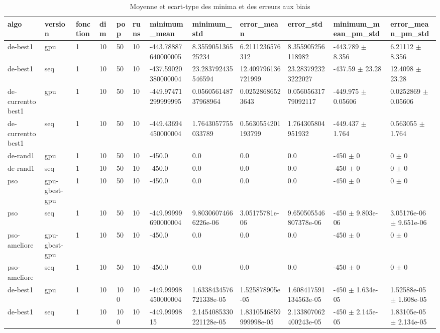 \begin{table}[t]
\centering
\caption{Moyenne et ecart-type des minima et des erreurs aux biais}
\label{tab:generated-minima}
\scriptsize
\begin{tabular}{llllllllllll}
\toprule
algo & version & fonction & dim & pop & runs & minimum\_mean & minimum\_std & error\_mean & error\_std & minimum\_mean\_pm\_std & error\_mean\_pm\_std \\
\midrule
de-best1 & gpu & 1 & 10 & 50 & 10 & -443.78887640000005 & 8.355905136525234 & 6.2111236576312 & 8.355905256118982 & -443.789 $\pm$ 8.356 & 6.21112 $\pm$ 8.356 \\
de-best1 & seq & 1 & 10 & 50 & 10 & -437.59020380000004 & 23.283792435546594 & 12.409796136721999 & 23.283792323222027 & -437.59 $\pm$ 23.28 & 12.4098 $\pm$ 23.28 \\
de-currenttobest1 & gpu & 1 & 10 & 50 & 10 & -449.97471299999995 & 0.056056148737968964 & 0.02528686523643 & 0.05605631779092117 & -449.975 $\pm$ 0.05606 & 0.0252869 $\pm$ 0.05606 \\
de-currenttobest1 & seq & 1 & 10 & 50 & 10 & -449.43694450000004 & 1.7643057755033789 & 0.5630554201193799 & 1.764305804951932 & -449.437 $\pm$ 1.764 & 0.563055 $\pm$ 1.764 \\
de-rand1 & gpu & 1 & 10 & 50 & 10 & -450.0 & 0.0 & 0.0 & 0.0 & -450 $\pm$ 0 & 0 $\pm$ 0 \\
de-rand1 & seq & 1 & 10 & 50 & 10 & -450.0 & 0.0 & 0.0 & 0.0 & -450 $\pm$ 0 & 0 $\pm$ 0 \\
pso & gpu-gbest-gpu & 1 & 10 & 50 & 10 & -450.0 & 0.0 & 0.0 & 0.0 & -450 $\pm$ 0 & 0 $\pm$ 0 \\
pso & seq & 1 & 10 & 50 & 10 & -449.99999690000004 & 9.80306074666226e-06 & 3.05175781e-06 & 9.650505546807378e-06 & -450 $\pm$ 9.803e-06 & 3.05176e-06 $\pm$ 9.651e-06 \\
pso-ameliore & gpu-gbest-gpu & 1 & 10 & 50 & 10 & -450.0 & 0.0 & 0.0 & 0.0 & -450 $\pm$ 0 & 0 $\pm$ 0 \\
pso-ameliore & seq & 1 & 10 & 50 & 10 & -450.0 & 0.0 & 0.0 & 0.0 & -450 $\pm$ 0 & 0 $\pm$ 0 \\
de-best1 & gpu & 1 & 10 & 100 & 10 & -449.99998450000004 & 1.6338434576721338e-05 & 1.525878905e-05 & 1.608417591134563e-05 & -450 $\pm$ 1.634e-05 & 1.52588e-05 $\pm$ 1.608e-05 \\
de-best1 & seq & 1 & 10 & 100 & 10 & -449.9999815 & 2.1454085330221128e-05 & 1.8310546859999998e-05 & 2.133807062400243e-05 & -450 $\pm$ 2.145e-05 & 1.83105e-05 $\pm$ 2.134e-05 \\

\end{tabular}
\end{table}
